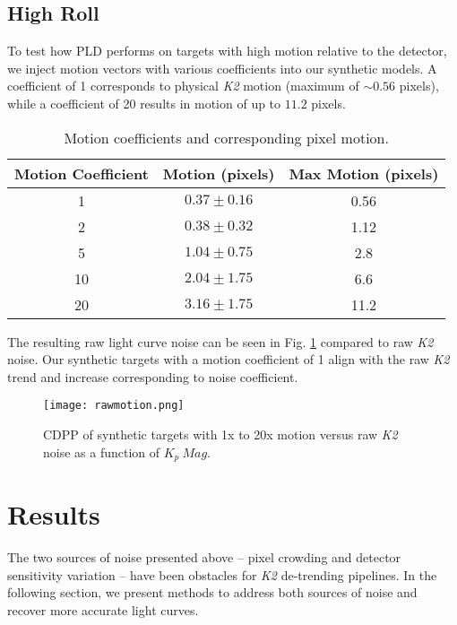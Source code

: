 \documentclass[12pt,preprint]{aastex}
\begin{document}
\subsection{High Roll}

To test how PLD performs on targets with high motion relative to the detector, we inject motion vectors with various coefficients into our synthetic models. A coefficient of 1 corresponds to physical \textit{K2} motion (maximum of $\sim 0.56$ pixels), while a coefficient of 20 results in motion of up to $11.2$ pixels.

\begin{table}[h!]
\begin{center}
    \begin{tabular}{c | c | c}
        Motion Coefficient & Motion (pixels) & Max Motion (pixels) \\
        \hline \hline
        1 & $0.37\pm0.16$ & 0.56 \\
        2 & $0.38\pm0.32$ & 1.12 \\
				5 & $1.04\pm0.75$ & 2.8 \\
				10 & $2.04\pm1.75$ & 6.6 \\
				20 & $3.16\pm1.75$ & 11.2 \\
   \end{tabular}
	 \caption{Motion coefficients and corresponding pixel motion.}
	 \label{table:1}
\end{center}
\end{table}

The resulting raw light curve noise can be seen in Fig. \ref{fig:rawmotion} compared to raw \textit{K2} noise. Our synthetic targets with a motion coefficient of 1 align with the raw \textit{K2} trend and increase corresponding to noise coefficient.

\begin{figure}[h]
	\centering
	\texttt{[image: rawmotion.png]}
	\caption{CDPP of synthetic targets with 1x to 20x motion versus raw \textit{K2} noise as a function of $K_p\ Mag$.}
	\label{fig:rawmotion}
\end{figure}

\section{Results}

The two sources of noise presented above -- pixel crowding and detector sensitivity variation -- have been obstacles for \textit{K2} de-trending pipelines. In the following section, we present methods to address both sources of noise and recover more accurate light curves.
\end{document}
